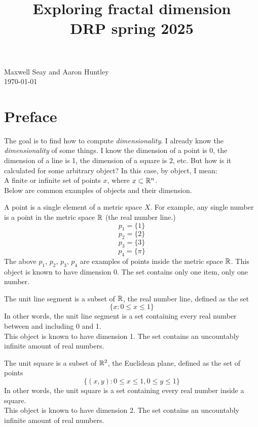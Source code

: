 \documentclass[11pt]{ekblite}
\begin{document}
\title{Exploring fractal dimension\\
DRP spring 2025}
\maketitle
\begin{center}
Maxwell Seay and Aaron Huntley\\
\today
\end{center}

\tableofcontents

\newpage

\section{Preface}
The goal is to find how to compute \textit{dimensionality}. I already know the \textit{dimensionality} of some things. I know the dimension of a point is 0, the dimension of a line is 1, the dimension of a square is 2, etc. But how is it calculated for some arbitrary object? In this case, by object, I mean:
\\[0.2in]A finite or infinite set of points $x$, where $x \subset \mathbb{R}^n$.
\\[0.2in]Below are common examples of objects and their dimension.
\begin{example}[Point]
	A point is a single element of a metric space $X$. For example, any single number is a point in the metric space $\mathbb{R}$ (the real number line.) 
	\[p_1 = \{1\}\]
	\[p_2 = \{2\}\]
	\[p_3 = \{3\}\]
	\[p_4 = \{\pi\}\]
	The above $p_1$, $p_2$, $p_3$, $p_4$ are examples of points inside the metric space $\mathbb{R}$. This object is known to have dimension 0. The set contains only one item, only one number.
\end{example}
\begin{example}
	The unit line segment is a subset of $\mathbb{R}$, the real number line, defined as the set 
	\[\{x : 0 \le x \le 1\}\]
	In other words, the unit line segment is a set containing every real number between and including 0 and 1.
	\\[0.2in]This object is known to have dimension 1. The set contains an uncountably infinite amount of real numbers.
\end{example}
\begin{example}
	The unit square is a subset of $\mathbb{R}^2$, the Euclidean plane, defined as the set of points
	\[\{(x,y) : 0 \le x \le 1, 0 \le y \le 1\}\]
	In other words, the unit square is a set containing every real number inside a square.
	\\[0.2in]This object is known to have dimension 2. The set contains an uncountably infinite amount of real numbers.
\end{example}
\end{document}
